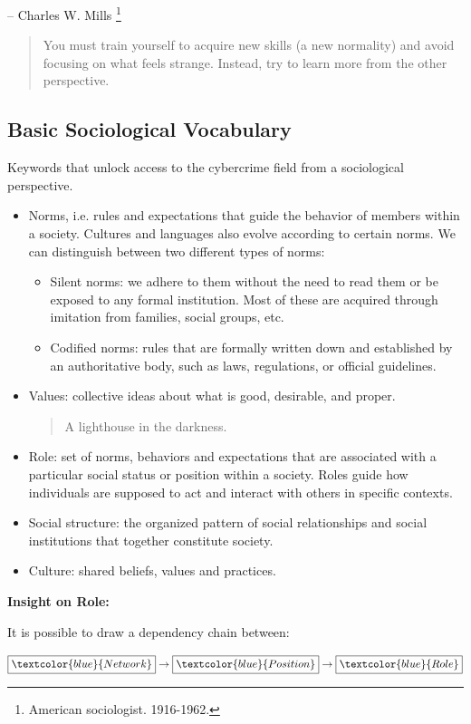 \hfill -- Charles W. Mills \footnote{American sociologist. 1916-1962.}

\begin{quote}
    You must train yourself to acquire new skills (a new normality) and avoid focusing on what feels strange. Instead, try to learn more from the other perspective.
\end{quote}

\subsection{Basic Sociological Vocabulary}
Keywords that unlock access to the cybercrime field from a sociological perspective.
\begin{itemize}
    \item Norms, i.e. rules and expectations that guide the behavior of members within a society. Cultures and languages also evolve according to certain norms. We can distinguish between two different types of norms:
    \begin{itemize}
        \item Silent norms: we adhere to them without the need to read them or be exposed to any formal institution. Most of these are acquired through imitation from families, social groups, etc.
        \item Codified norms: rules that are formally written down and established by an authoritative body, such as laws, regulations, or official guidelines.
    \end{itemize}
    \item Values: collective ideas about what is good, desirable, and proper.
        \begin{quote}
            A lighthouse in the darkness. 
        \end{quote}
    \item Role: set of norms, behaviors and expectations that are associated with a particular social status or position within a society. Roles guide how individuals are supposed to act and interact with others in specific contexts.
    \item Social structure: the organized pattern of social relationships and social institutions that together constitute society.
    \item Culture: shared beliefs, values and practices.
\end{itemize} \textbf{Insight on Role:}

It is possible to draw a dependency chain between: 
\begin{center}
    $\boxed{ \textcolor{blue}{Network}} \rightarrow \boxed{\textcolor{blue}{Position}} \rightarrow \boxed{\textcolor{blue}{Role}}$
\end{center}

